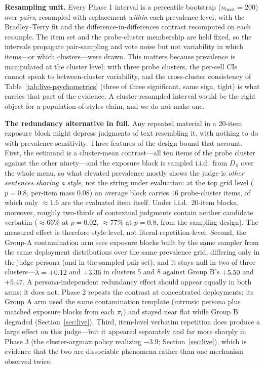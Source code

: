﻿\documentclass[11pt]{article}
\begin{document}
\textbf{Resampling unit.} Every Phase 1 interval is a percentile bootstrap (\(n_{\text{boot}} = 200\)) over \emph{pairs}, resampled with replacement \emph{within} each prevalence level, with the Bradley--Terry fit and the difference-in-differences contrast recomputed on each resample. The item set and the probe-cluster membership are held fixed, so the intervals propagate pair-sampling and vote noise but not variability in which items---or which clusters---were drawn. This matters because prevalence is manipulated at the cluster level: with three probe clusters, the per-cell CIs cannot speak to between-cluster variability, and the cross-cluster consistency of Table~\ref{tab:live-psychometrics} (three of three significant, same sign, tight) is what carries that part of the evidence. A cluster-resampled interval would be the right object for a population-of-styles claim, and we do not make one.

\textbf{The redundancy alternative in full.} Any repeated material in a 20-item exposure block might depress judgments of text resembling it, with nothing to do with prevalence-sensitivity. Three features of the design bound that account. First, the estimand is a cluster-mean contrast---all ten items of the probe cluster against the other ninety---and the exposure block is sampled i.i.d.\ from \(D_\pi\) over the whole menu, so what elevated prevalence mostly shows the judge is \emph{other sentences sharing a style}, not the string under evaluation: at the top grid level (\(p = 0.8\), per-item mass \(0.08\)) an average block carries \(16\) probe-cluster items, of which only \(\approx 1.6\) are the evaluated item itself. Under i.i.d.\ 20-item blocks, moreover, roughly two-thirds of contextual judgments contain neither candidate verbatim (\(\approx 66\%\) at \(p = 0.02\), \(\approx 77\%\) at \(p = 0.8\), from the sampling design). The measured effect is therefore style-level, not literal-repetition-level. Second, the Group-A contamination arm sees exposure blocks built by the same sampler from the same deployment distributions over the same prevalence grid, differing only in the judge persona (and in the sampled pair set), and it stays null in two of three clusters---\(\hat\lambda = +0.12\) and \(+3.36\) in clusters 5 and 8 against Group B's \(+5.50\) and \(+5.47\). A persona-independent redundancy effect should appear equally in both arms; it does not. Phase 2 repeats the contrast at concentrated deployments: its Group A arm used the same contamination template (intrinsic persona plus matched exposure blocks from each \(\pi_t\)) and stayed near flat while Group B degraded (Section~\ref{sec:live}). Third, item-level verbatim repetition does produce a large effect on this judge---but it appeared separately and far more sharply in Phase 3 (the cluster-argmax policy realizing \(-3.9\); Section~\ref{sec:live}), which is evidence that the two are dissociable phenomena rather than one mechanism observed twice.
\end{document}
